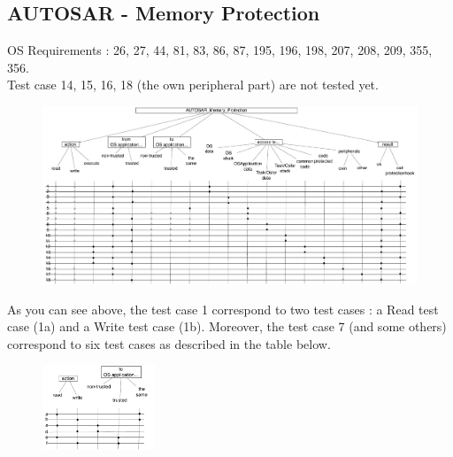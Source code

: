 \documentclass[10pt]{article}
\begin{document}
		
	\subsection{AUTOSAR - Memory Protection} \label{memprot}
	OS Requirements : 26, 27, 44, 81, 83, 86, 87, 195, 196, 198, 207, 208, 209, 355, 356.\\
	Test case 14, 15, 16, 18 (the own peripheral part) are not tested yet.\\
	
	\begin{figure}[htbp] %
  		\centering
		\includegraphics[width=1\textwidth]{graphics/AUTOSAR_Memory_Protection.pdf}
	\end{figure}
	
	As you can see above, the test case 1 correspond to two test cases : a Read test case (1a) and a Write test case (1b). Moreover, the test case 7 (and some others) correspond to six test cases as described in the table below.\\
	
	\begin{figure}[htbp] %
  		\centering
		\includegraphics[width=0.3\textwidth]{graphics/AUTOSAR_Memory_Protection_test_cases.pdf}
	\end{figure}
	
\end{document}
